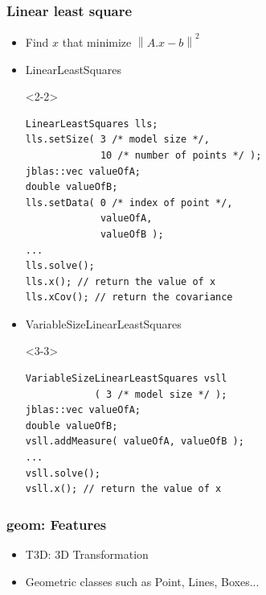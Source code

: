\documentclass[compress]{beamer}
\begin{document}

\begin{frame}[fragile]
  \frametitle{Linear least square}
  \begin{itemize}
    \item<1-> Find $ x $ that minimize $ \left\| A.x - b \right\|^2 $
    \item<2-> LinearLeastSquares
      \begin{onlyenv}<2-2>
        \begin{lstlisting}
LinearLeastSquares lls;
lls.setSize( 3 /* model size */,
             10 /* number of points */ );
jblas::vec valueOfA;
double valueOfB;
lls.setData( 0 /* index of point */,
             valueOfA,
             valueOfB );
...
lls.solve();
lls.x(); // return the value of x
lls.xCov(); // return the covariance
        \end{lstlisting}
      \end{onlyenv}
    \item<3-> VariableSizeLinearLeastSquares
      \begin{onlyenv}<3-3>
        \begin{lstlisting}
VariableSizeLinearLeastSquares vsll
            ( 3 /* model size */ );
jblas::vec valueOfA;
double valueOfB;
vsll.addMeasure( valueOfA, valueOfB );
...
vsll.solve();
vsll.x(); // return the value of x
        \end{lstlisting}
      \end{onlyenv}
  \end{itemize}

\end{frame}


\begin{frame}
  \frametitle{geom: Features}
  \begin{itemize}
   \item<1-> T3D: 3D Transformation
   \item<2-> Geometric classes such as Point, Lines, Boxes...
  \end{itemize}
\end{frame}
\end{document}
